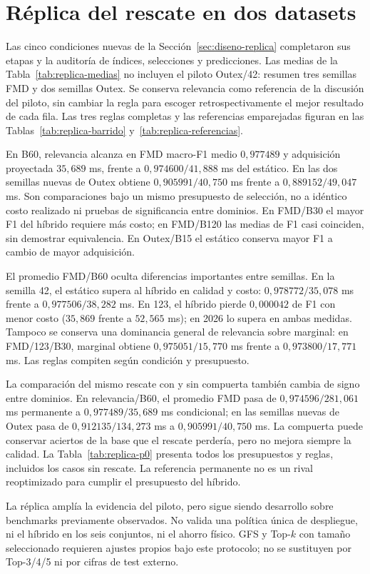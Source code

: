 \section{Réplica del rescate en dos datasets}\label{sec:resultados-replica}
Las cinco condiciones nuevas de la Sección~\ref{sec:diseno-replica} completaron sus etapas y la auditoría de índices, selecciones y predicciones. Las medias de la Tabla~\ref{tab:replica-medias} no incluyen el piloto Outex/42: resumen tres semillas FMD y dos semillas Outex. Se conserva relevancia como referencia de la discusión del piloto, sin cambiar la regla para escoger retrospectivamente el mejor resultado de cada fila. Las tres reglas completas y las referencias emparejadas figuran en las Tablas~\ref{tab:replica-barrido} y~\ref{tab:replica-referencias}.


\FloatBarrier

En B60, relevancia alcanza en FMD macro-F1 medio $0{,}977489$ y adquisición proyectada $35{,}689$ ms, frente a $0{,}974600/41{,}888$ ms del estático. En las dos semillas nuevas de Outex obtiene $0{,}905991/40{,}750$ ms frente a $0{,}889152/49{,}047$ ms. Son comparaciones bajo un mismo presupuesto de selección, no a idéntico costo realizado ni pruebas de significancia entre dominios. En FMD/B30 el mayor F1 del híbrido requiere más costo; en FMD/B120 las medias de F1 casi coinciden, sin demostrar equivalencia. En Outex/B15 el estático conserva mayor F1 a cambio de mayor adquisición.

El promedio FMD/B60 oculta diferencias importantes entre semillas. En la semilla 42, el estático supera al híbrido en calidad y costo: $0{,}978772/35{,}078$ ms frente a $0{,}977506/38{,}282$ ms. En 123, el híbrido pierde $0{,}000042$ de F1 con menor costo ($35{,}869$ frente a $52{,}565$ ms); en 2026 lo supera en ambas medidas. Tampoco se conserva una dominancia general de relevancia sobre marginal: en FMD/123/B30, marginal obtiene $0{,}975051/15{,}770$ ms frente a $0{,}973800/17{,}771$ ms. Las reglas compiten según condición y presupuesto.

La comparación del mismo rescate con y sin compuerta también cambia de signo entre dominios. En relevancia/B60, el promedio FMD pasa de $0{,}974596/281{,}061$ ms permanente a $0{,}977489/35{,}689$ ms condicional; en las semillas nuevas de Outex pasa de $0{,}912135/134{,}273$ ms a $0{,}905991/40{,}750$ ms. La compuerta puede conservar aciertos de la base que el rescate perdería, pero no mejora siempre la calidad. La Tabla~\ref{tab:replica-p0} presenta todos los presupuestos y reglas, incluidos los casos sin rescate. La referencia permanente no es un rival reoptimizado para cumplir el presupuesto del híbrido.

La réplica amplía la evidencia del piloto, pero sigue siendo desarrollo sobre benchmarks previamente observados. No valida una política única de despliegue, ni el híbrido en los seis conjuntos, ni el ahorro físico. GFS y Top-$k$ con tamaño seleccionado requieren ajustes propios bajo este protocolo; no se sustituyen por Top-3/4/5 ni por cifras de test externo.
\FloatBarrier

